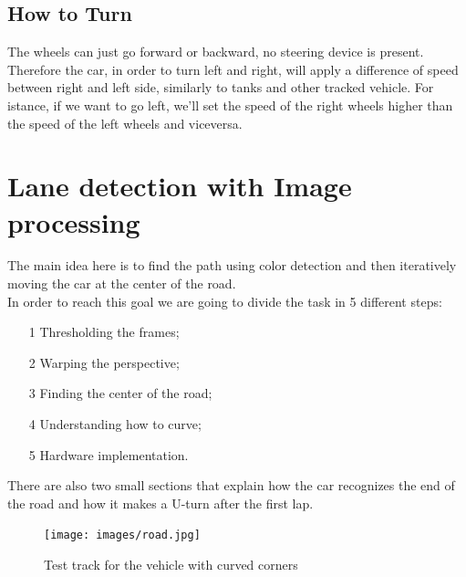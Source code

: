 \documentclass[12pt,a4paper]{article}
\begin{document}
\begin{large}
\subsection{How to Turn}

The wheels can just go forward or backward, no steering device is present. Therefore the car, in order to turn left and right, will apply a difference of speed between right and left side, similarly to tanks and other tracked vehicle.
For istance, if we want to go left, we'll set the speed of the right wheels higher than the speed of the left wheels and viceversa.

\section{Lane detection with Image processing}

The main idea here is to find the path using color detection and then iteratively moving the car at the center of the road.\\
In order to reach this goal we are going to divide the task in 5 different steps:

\begin{itemize}
  \item[1] Thresholding the frames;
  \item[2] Warping the perspective;
  \item[3] Finding the center of the road;
  \item[4] Understanding how to curve;
  \item[5] Hardware implementation.
  \end{itemize}

There are also two small sections that explain how the car recognizes the end of the road and how it makes a U-turn after the first lap.

\begin{figure}[hbp]
\centering
\texttt{[image: images/road.jpg]}
\caption{Test track for the vehicle with curved corners}
\end{figure}


\end{large}
\end{document}
